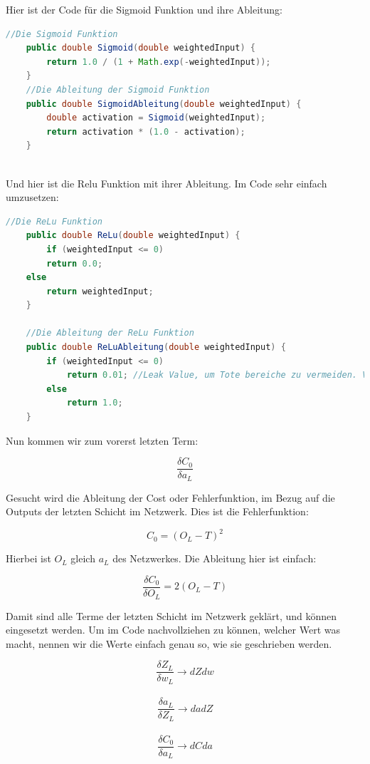 \documentclass[12pt]{article}
\begin{document}
Hier ist der Code für die Sigmoid Funktion und ihre Ableitung:
\begin{lstlisting}[language=Java] 
    //Die Sigmoid Funktion
    public double Sigmoid(double weightedInput) {
        return 1.0 / (1 + Math.exp(-weightedInput));
    }
    //Die Ableitung der Sigmoid Funktion
    public double SigmoidAbleitung(double weightedInput) {
        double activation = Sigmoid(weightedInput);
        return activation * (1.0 - activation);
    }
    
\end{lstlisting} 

Und hier ist die Relu Funktion mit ihrer Ableitung. Im Code sehr einfach umzusetzen:

\begin{lstlisting}[language=Java] 
    //Die ReLu Funktion
    public double ReLu(double weightedInput) {
        if (weightedInput <= 0)
        return 0.0;
    else
        return weightedInput;
    }
        
    //Die Ableitung der ReLu Funktion
    public double ReLuAbleitung(double weightedInput) {
        if (weightedInput <= 0)
            return 0.01; //Leak Value, um Tote bereiche zu vermeiden. Vermutlich bei Sigmoid kein Problem
        else
            return 1.0;
    }
\end{lstlisting} 

Nun kommen wir zum vorerst letzten Term:

$$\frac{\delta C_0}{\delta a_L}$$

Gesucht wird die Ableitung der Cost oder Fehlerfunktion, im Bezug auf die Outputs der letzten Schicht im Netzwerk. Dies ist die Fehlerfunktion:

$$C_0 = (O_L - T)^2$$

Hierbei ist $O_L$ gleich $a_L$ des Netzwerkes.
Die Ableitung hier ist einfach:

$$\frac{\delta C_0}{\delta O_L} = 2(O_L - T)$$

Damit sind alle Terme der letzten Schicht im Netzwerk geklärt, und können eingesetzt werden.
Um im Code nachvollziehen zu können, welcher Wert was macht, nennen wir die Werte einfach genau so, wie sie geschrieben werden.


$$\frac{\delta Z_L}{\delta w_L} \rightarrow dZdw $$ \\
$$\frac{\delta a_L}{\delta Z_L} \rightarrow dadZ $$ \\
$$\frac{\delta C_0}{\delta a_L} \rightarrow dCda $$ \\
\end{document}
